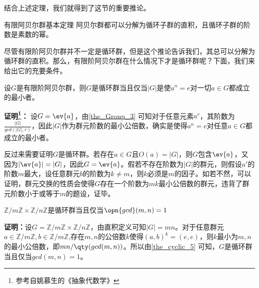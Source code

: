 结合上述定理，我们就得到了这节的重要推论。

\begin{corollary}{有限阿贝尔群基本定理}
阿贝尔群都可以分解为循环子群的直积，且循环子群的阶数是素数的幂。
\end{corollary}
尽管有限阶阿贝尔群并不一定是循环群，但是这个推论告诉我们，其总可以分解为循环群的直积。那么，有限阶阿贝尔群在什么情况下才是循环群呢？下面，我们来给出它的充要条件。
\begin{theorem}{}\label{the_cyclic_5}
设$G$是有限阶阿贝尔群，则$G$是循环群当且仅当$|G|$是使$a^n=e$对一切$a\in G$都成立的最小者。
\end{theorem}

\textbf{证明\footnote{参考自姚慕生的《抽象代数学》}：}
设$G=\ev{a}$，由\autoref{the_Group_3} 可知对于任意元素$a^r$，其阶数为$\frac{|G|}{gcd(|G|,r)}$，因此$|G|$作为群元阶数的最小公倍数，确实是使得$a^n=e$对任意$a\in G$都成立的最小者。

反过来需要证明$G$是循环群。若存在$a\in G$且$O(a)=|G|$，则$G$包含$\ev{a}$，又因为$|\ev{a}|=|G|$，因此$G=\ev{a}$。假若不存在阶数为$|G|$的群元，则假设$a'$的阶数$m$最大，设任意群元$b$的阶数为$k\neq m$，则$k$必须是$m$的因子。如若不然，可以证明，群元交换的性质会使得$G$存在一个阶数为$mk$最小公倍数的群元，违背了群元阶数小于或等于$m$的题设，证毕。

\begin{corollary}{}
$\mathbb{Z} / m \mathbb{Z} \times \mathbb{Z} / n \mathbb{Z}$是循环群当且仅当$\opn{gcd}(m,n)=1$
\end{corollary}
\textbf{证明：}设$G=\mathbb{Z} / m \mathbb{Z} \times \mathbb{Z} / n \mathbb{Z}$，由直积定义可知$|G|=mn$。对于任意群元$a\in \mathbb{Z} / m \mathbb{Z},b\in \mathbb{Z} / m \mathbb{Z}$,存在$m,n$的公倍数$k$使得$(a,b)^k=(e,e)$，则$k$最小为$m,n$的最小公倍数，即$mn/\qty(gcd(m,n))$。所以由\autoref{the_cyclic_5}  可知，$G$是循环群当且仅当$gcd(m,n)=1$。